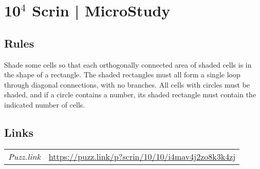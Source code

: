 \section{10$^4$ Scrin | {\normalfont MicroStudy}}
\label{sec:29-10-4-scrin-microstudy}

\subsection*{Rules}
\begin{markdown}
Shade some cells so that each orthogonally connected area of shaded cells is in the shape of a rectangle. The shaded rectangles must all form a single loop through diagonal connections, with no branches. All cells with circles must be shaded, and if a circle contains a number, its shaded rectangle must contain the indicated number of cells.
\end{markdown}
\subsection*{Links}
\begin{tabularx}{\textwidth}{l X}
\emph{Puzz.link} & \url{https://puzz.link/p?scrin/10/10/i4mav4j2zo8k3k4zj} \\
\end{tabularx}
\pagebreak
